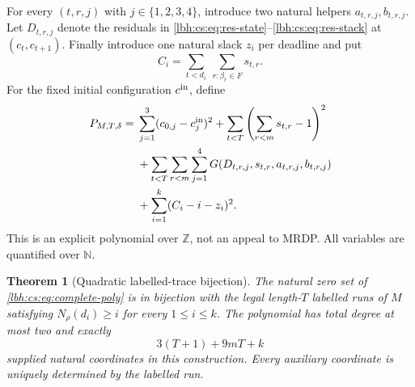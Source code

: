 \documentclass[11pt,letterpaper]{article}
\newtheorem{theorem}{Theorem}[section]
\theoremstyle{definition}
\theoremstyle{remark}
\newcommand{\N}{\mathbb N}
\newcommand{\Z}{\mathbb Z}
\newcommand{\1}{\mathbf 1}
\begin{document}
For every $(t,r,j)$ with $j\in\{1,2,3,4\}$, introduce two natural helpers
$a_{t,r,j},b_{t,r,j}$. Let $D_{t,r,j}$ denote the residuals in
\eqref{lbh:cs:eq:res-state}--\eqref{lbh:cs:eq:res-stack} at $(c_t,c_{t+1})$. Finally
introduce one natural slack $z_i$ per deadline and put
\begin{equation}\label{lbh:cs:eq:count}
 C_i=\sum_{t<d_i}\ \sum_{r:\beta_r\in F}s_{t,r}.
\end{equation}
For the fixed initial configuration $c^{\rm in}$, define
\begin{align}
 P_{M,T,\delta}={}&
 \sum_{j=1}^{3}(c_{0,j}-c^{\rm in}_j)^2
 +\sum_{t<T}\left(\sum_{r<m}s_{t,r}-1\right)^2\notag\\
 &+\sum_{t<T}\sum_{r<m}\sum_{j=1}^{4}
 G(D_{t,r,j},s_{t,r},a_{t,r,j},b_{t,r,j})\notag\\
 &+\sum_{i=1}^{k}(C_i-i-z_i)^2.
 \label{lbh:cs:eq:complete-poly}
\end{align}
This is an explicit polynomial over $\Z$, not an appeal to MRDP.
All variables are quantified over $\N$.

\begin{theorem}[Quadratic labelled-trace bijection]\label{lbh:cs:thm:quadratic}
The natural zero set of \eqref{lbh:cs:eq:complete-poly} is in bijection with the
legal length-$T$ labelled runs of $M$ satisfying
$N_\rho(d_i)\geq i$ for every $1\leq i\leq k$. The polynomial has total
degree at most two and exactly
\begin{equation}\label{lbh:cs:eq:count-vars}
 3(T+1)+9mT+k
\end{equation}
supplied natural coordinates in this construction. Every auxiliary
coordinate is uniquely determined by the labelled run.
\end{theorem}
\end{document}
